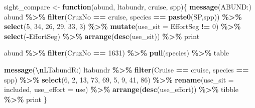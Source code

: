 \documentclass[
]{book}
\newenvironment{Shaded}{\begin{snugshade}}{\end{snugshade}}
\newcommand{\AttributeTok}[1]{\textcolor[rgb]{0.13,0.29,0.53}{#1}}
\newcommand{\ControlFlowTok}[1]{\textcolor[rgb]{0.13,0.29,0.53}{\textbf{#1}}}
\newcommand{\DecValTok}[1]{\textcolor[rgb]{0.00,0.00,0.81}{#1}}
\newcommand{\FunctionTok}[1]{\textcolor[rgb]{0.13,0.29,0.53}{\textbf{#1}}}
\newcommand{\NormalTok}[1]{#1}
\newcommand{\OtherTok}[1]{\textcolor[rgb]{0.56,0.35,0.01}{#1}}
\newcommand{\SpecialCharTok}[1]{\textcolor[rgb]{0.81,0.36,0.00}{\textbf{#1}}}
\newcommand{\StringTok}[1]{\textcolor[rgb]{0.31,0.60,0.02}{#1}}
\begin{document}
\begin{Shaded}
\begin{Highlighting}[]
\NormalTok{sight\_compare }\OtherTok{\textless{}{-}} \ControlFlowTok{function}\NormalTok{(abund, ltabundr, cruise, spp)\{}
  \FunctionTok{message}\NormalTok{(}\StringTok{\textquotesingle{}ABUND:\textquotesingle{}}\NormalTok{)}
\NormalTok{  abund }\SpecialCharTok{\%\textgreater{}\%}
    \FunctionTok{filter}\NormalTok{(CruzNo }\SpecialCharTok{==}\NormalTok{ cruise, species }\SpecialCharTok{==} \FunctionTok{paste0}\NormalTok{(}\StringTok{\textquotesingle{}SP\textquotesingle{}}\NormalTok{,spp)) }\SpecialCharTok{\%\textgreater{}\%}
    \FunctionTok{select}\NormalTok{(}\DecValTok{5}\NormalTok{, }\DecValTok{34}\NormalTok{, }\DecValTok{26}\NormalTok{, }\DecValTok{29}\NormalTok{, }\DecValTok{33}\NormalTok{, }\DecValTok{3}\NormalTok{) }\SpecialCharTok{\%\textgreater{}\%}
    \FunctionTok{mutate}\NormalTok{(}\AttributeTok{use\_sit =}\NormalTok{ EffortSeg }\SpecialCharTok{!=} \DecValTok{0}\NormalTok{) }\SpecialCharTok{\%\textgreater{}\%}
    \FunctionTok{select}\NormalTok{(}\SpecialCharTok{{-}}\NormalTok{EffortSeg) }\SpecialCharTok{\%\textgreater{}\%}
    \FunctionTok{arrange}\NormalTok{(}\FunctionTok{desc}\NormalTok{(use\_sit)) }\SpecialCharTok{\%\textgreater{}\%}
\NormalTok{    print}

\NormalTok{  abund }\SpecialCharTok{\%\textgreater{}\%}
    \FunctionTok{filter}\NormalTok{(CruzNo }\SpecialCharTok{==} \DecValTok{1631}\NormalTok{) }\SpecialCharTok{\%\textgreater{}\%} \FunctionTok{pull}\NormalTok{(species) }\SpecialCharTok{\%\textgreater{}\%}\NormalTok{ table}
  
  
  \FunctionTok{message}\NormalTok{(}\StringTok{\textquotesingle{}}\SpecialCharTok{\textbackslash{}n}\StringTok{LTabundR:\textquotesingle{}}\NormalTok{)}
\NormalTok{  ltabundr }\SpecialCharTok{\%\textgreater{}\%}
    \FunctionTok{filter}\NormalTok{(Cruise }\SpecialCharTok{==}\NormalTok{ cruise, species }\SpecialCharTok{==}\NormalTok{ spp) }\SpecialCharTok{\%\textgreater{}\%}
    \FunctionTok{select}\NormalTok{(}\DecValTok{6}\NormalTok{, }\DecValTok{2}\NormalTok{, }\DecValTok{13}\NormalTok{, }\DecValTok{73}\NormalTok{, }\DecValTok{69}\NormalTok{, }\DecValTok{5}\NormalTok{, }\DecValTok{9}\NormalTok{, }\DecValTok{41}\NormalTok{, }\DecValTok{86}\NormalTok{) }\SpecialCharTok{\%\textgreater{}\%}
    \FunctionTok{rename}\NormalTok{(}\AttributeTok{use\_sit =}\NormalTok{ included, }\AttributeTok{use\_effort =}\NormalTok{ use) }\SpecialCharTok{\%\textgreater{}\%}
    \FunctionTok{arrange}\NormalTok{(}\FunctionTok{desc}\NormalTok{(use\_effort)) }\SpecialCharTok{\%\textgreater{}\%}
\NormalTok{    tibble }\SpecialCharTok{\%\textgreater{}\%}\NormalTok{ print}
\NormalTok{\}}
\end{Highlighting}
\end{Shaded}
\end{document}
